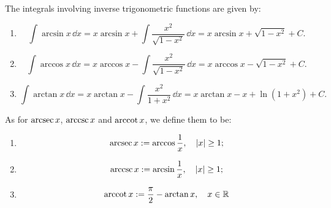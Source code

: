     \begin{theoremenv}
        The integrals involving inverse trigonometric functions are given by:
        \begin{enumerate}
            \item [(1)]
            \[
            \int \arcsin x\, \dd x = x \arcsin x + \int \frac{x^2}{\sqrt{1-x^2}}\, \dd x = x \arcsin x + \sqrt{1-x^2} + C.
            \]
            \item [(2)]
            \[
            \int \arccos x\, \dd x = x \arccos x - \int \frac{x^2}{\sqrt{1-x^2}}\, \dd x = x \arccos x - \sqrt{1-x^2} + C.
            \]
            \item [(3)]
            \[
            \int \arctan x\, \dd x = x \arctan x - \int \frac{x^2}{1+x^2}\, \dd x = x \arctan x - x + \ln(1+x^2) + C.
            \]
        \end{enumerate}
    \end{theoremenv}
    \begin{remarkenv}
        As for $\arcsec x$, $\arccsc x$ and $\arccot x$, we define them to be:
        \begin{enumerate}
            \item $$ \arcsec x := \arccos \dfrac{1}{x},\quad |x| \geq 1; $$
            \item $$ \arccsc x := \arcsin \dfrac{1}{x},\quad |x| \geq 1; $$
            \item $$ \arccot x := \dfrac{\pi}{2}-\arctan x,\quad x\in\mathbb{R}$$
        \end{enumerate}
    \end{remarkenv}

